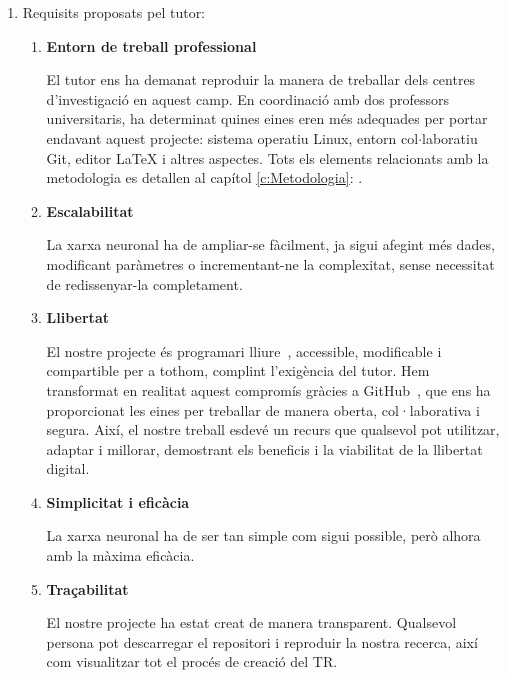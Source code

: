 \begin{enumerate}

    \item Requisits proposats pel tutor:

    \begin{enumerate}

        \item \textbf{Entorn de treball professional}

        El tutor ens ha demanat reproduir la manera de treballar dels centres d'investigació en aquest camp. En coordinació amb dos professors universitaris, ha determinat quines eines eren més adequades per portar endavant aquest projecte: sistema operatiu Linux, entorn col$\cdot$laboratiu Git, editor LaTeX i altres aspectes. Tots els elements relacionats amb la metodologia es detallen al capítol \ref{c:Metodologia}: .

        \item \textbf{Escalabilitat}

        La xarxa neuronal ha de ampliar-se fàcilment, ja sigui afegint més dades, modificant paràmetres o incrementant-ne la complexitat, sense necessitat de redissenyar-la completament.

        \item \textbf{Llibertat}

        El nostre projecte és programari lliure~\cite{ProgramariLliure}, accessible, modificable i compartible per a tothom, complint l’exigència del tutor. Hem transformat en realitat aquest compromís gràcies a GitHub~\cite{GitHub}, que ens ha proporcionat les eines per treballar de manera oberta, col·laborativa i segura. Així, el nostre treball esdevé un recurs que qualsevol pot utilitzar, adaptar i millorar, demostrant els beneficis i la viabilitat de la llibertat digital.

        \item \textbf{Simplicitat i eficàcia}

        La xarxa neuronal ha de ser tan simple com sigui possible, però alhora amb la màxima eficàcia.

        \item \textbf{Traçabilitat}

        El nostre projecte ha estat creat de manera transparent. Qualsevol persona pot descarregar el repositori i reproduir la nostra recerca, així com visualitzar tot el procés de creació del TR.

    \end{enumerate}


\end{enumerate}
